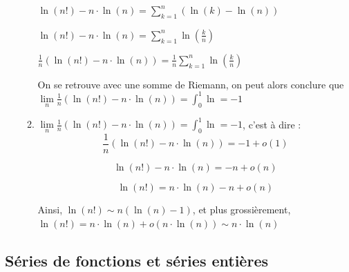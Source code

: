 \documentclass[]{article}
\begin{document}
\begin{enumerate}
\begin{enumerate}
	$\ln(n!) - n \cdot \ln(n) = \displaystyle \sum_{k=1}^{n} (\ln(k) - \ln(n))$
	
	$\ln(n!) - n \cdot \ln(n) = \displaystyle \sum_{k=1}^{n} \ln \left(\frac{k}{n}\right)$
	
	$\frac{1}{n} (\ln(n!) - n \cdot \ln(n)) = \frac{1}{n}\displaystyle \sum_{k=1}^{n} \ln \left(\frac{k}{n}\right)$
	
	On se retrouve avec une somme de Riemann, on peut alors conclure que $\displaystyle \lim\limits_{n} \frac{1}{n} (\ln(n!) - n \cdot \ln(n)) = \int_0^1 \ln = -1$
	
	\item $\displaystyle \lim\limits_{n} \frac{1}{n} (\ln(n!) - n \cdot \ln(n)) = \int_0^1 \ln = -1$, c'est à dire :
	$$\frac{1}{n} (\ln(n!) - n \cdot \ln(n)) = -1 + o(1)$$
	
	$$\ln(n!) - n \cdot \ln(n) = -n + o(n)$$
	
	$$\ln(n!) = n \cdot \ln(n) - n + o(n)$$
	
	Ainsi, $\ln(n!) \sim n(\ln(n)-1)$, et plus grossièrement, $\ln(n!) = n \cdot \ln(n) + o(n \cdot \ln(n)) \sim n \cdot \ln(n)$
\end{enumerate}

\end{enumerate}

\subsection{Séries de fonctions et séries entières}
\end{document}
